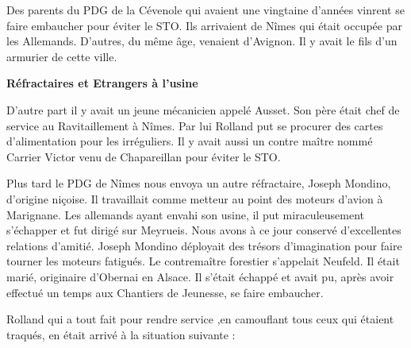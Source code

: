 \vspace{0.45cm}

Des parents du PDG de la Cévenole qui avaient une vingtaine d’années vinrent se faire
embaucher pour éviter le STO. Ils arrivaient de Nîmes qui était occupée par les Allemands.
D’autres, du même âge, venaient d’Avignon. Il y avait le fils d’un armurier de cette ville.

\vspace{0.55cm}

\textbf{Réfractaires et Etrangers à l’usine}

\vspace{0.35cm}

D’autre part il y avait un jeune mécanicien appelé Ausset. Son père était chef de service au
Ravitaillement à Nîmes. Par lui Rolland put se procurer des cartes d’alimentation pour les
irréguliers. Il y avait aussi un contre maître nommé Carrier Victor venu de Chapareillan pour
éviter le STO.

\vspace{0.45cm}

Plus tard le PDG de Nîmes nous envoya un autre réfractaire, Joseph Mondino, d’origine
niçoise. Il travaillait comme metteur au point des moteurs d’avion à Marignane. Les
allemands ayant envahi son usine, il put miraculeusement s’échapper et fut dirigé sur
Meyrueis. Nous avons à ce jour conservé d’excellentes relations d’amitié. Joseph Mondino
déployait des trésors d’imagination pour faire tourner les moteurs fatigués. Le contremaître
forestier s’appelait Neufeld. Il était marié, originaire d’Obernai en Alsace. Il s’était échappé
et avait pu, après avoir effectué un temps aux Chantiers de Jeunesse, se faire embaucher.

\vspace{0.45cm}

Rolland qui a tout fait pour rendre service ,en camouflant tous ceux qui étaient traqués, en
était arrivé à la situation suivante :
